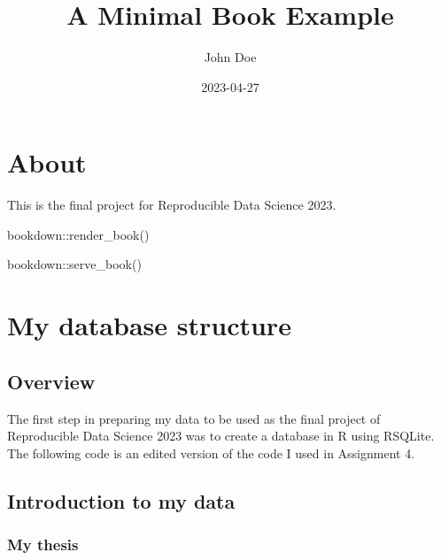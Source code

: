\documentclass[
]{book}
\title{A Minimal Book Example}
\author{John Doe}
\date{2023-04-27}
\newenvironment{Shaded}{\begin{snugshade}}{\end{snugshade}}
\newcommand{\FunctionTok}[1]{\textcolor[rgb]{0.00,0.00,0.00}{#1}}
\newcommand{\NormalTok}[1]{#1}
\newcommand{\SpecialCharTok}[1]{\textcolor[rgb]{0.00,0.00,0.00}{#1}}
\begin{document}
\maketitle

{
\setcounter{tocdepth}{1}
\tableofcontents
}
\hypertarget{about}{%
\chapter{About}\label{about}}

This is the final project for Reproducible Data Science 2023.

\begin{Shaded}
\begin{Highlighting}[]
\NormalTok{bookdown}\SpecialCharTok{::}\FunctionTok{render\_book}\NormalTok{()}
\end{Highlighting}
\end{Shaded}

\begin{Shaded}
\begin{Highlighting}[]
\NormalTok{bookdown}\SpecialCharTok{::}\FunctionTok{serve\_book}\NormalTok{()}
\end{Highlighting}
\end{Shaded}

\hypertarget{my-database-structure}{%
\chapter{My database structure}\label{my-database-structure}}

\hypertarget{overview}{%
\section{Overview}\label{overview}}

The first step in preparing my data to be used as the final project of Reproducible Data Science 2023 was to create a database in R using RSQLite. The following code is an edited version of the code I used in Assignment 4.

\hypertarget{introduction-to-my-data}{%
\section{Introduction to my data}\label{introduction-to-my-data}}

\hypertarget{my-thesis}{%
\subsection{My thesis}\label{my-thesis}}
\end{document}
